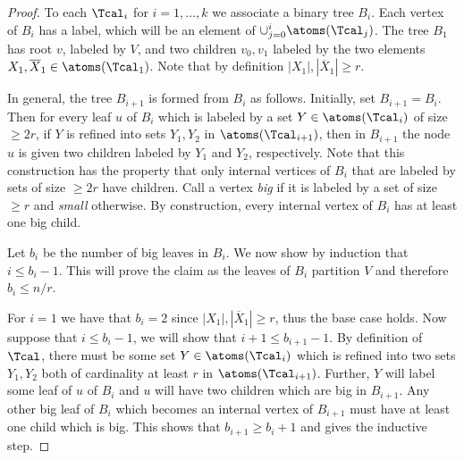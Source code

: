 \begin{proof}
To each $\Tcal_i$ for $i = 1, \ldots, k$ we associate a binary tree $B_i$.  Each vertex of $B_i$ has a label, which will be an element of $\cup_{j=0}^i \atoms(\Tcal_j)$.  
The tree $B_1$ has root $v$, labeled by $V$, and two children $v_0, v_1$ labeled by the two elements $X_1, \overline{X}_1 \in \atoms(\Tcal_1)$.  Note that by definition 
$|X_1|, |\overline{X}_1| \ge r$.  

In general, the tree $B_{i+1}$ is formed from $B_i$ as follows.  Initially, set $B_{i+1}=B_i$.  Then for every leaf $u$ of $B_i$ which is labeled by a set $Y \in \atoms(\Tcal_i)$ of size $\ge 2r$, 
if $Y$ is refined into sets $Y_1, Y_2$ in $\atoms(\Tcal_{i+1})$, then in $B_{i+1}$ the node $u$ is given two children labeled by $Y_1$ and $Y_2$, respectively.  Note that this construction 
has the property that only internal vertices of $B_i$ that are labeled by sets of size $\ge 2r$ have children.  Call a vertex \emph{big} if it is labeled by a set of size $\ge r$ and \emph{small} 
otherwise.  By construction, every internal vertex of $B_i$ has at least one big child.

Let $b_i$ be the number of big leaves in $B_i$.  We now show by induction that $i \le b_i - 1$.  This will prove the claim as the leaves of $B_i$ partition $V$ and therefore 
$b_i \le n/r$.  

For $i=1$ we have that $b_i = 2$ since $|X_1|, |\overline{X}_1| \ge r$, thus the base case holds.  Now suppose that $i \le b_i-1$, we will show that $i+1 \le b_{i+1}-1$.  
By definition of $\Tcal$, there must be some set $Y \in \atoms(\Tcal_i)$ which is refined into two sets $Y_1, Y_2$ both of cardinality at least $r$ in $\atoms(\Tcal_{i+1})$.  
Further, $Y$ will label some leaf of $u$ of $B_i$ and $u$ will have two children which are big in $B_{i+1}$.  Any other big leaf of $B_i$ which becomes an internal vertex 
of $B_{i+1}$ must have at least one child which is big.  This shows that $b_{i+1} \ge b_i + 1$ and gives the inductive step.
\end{proof}

